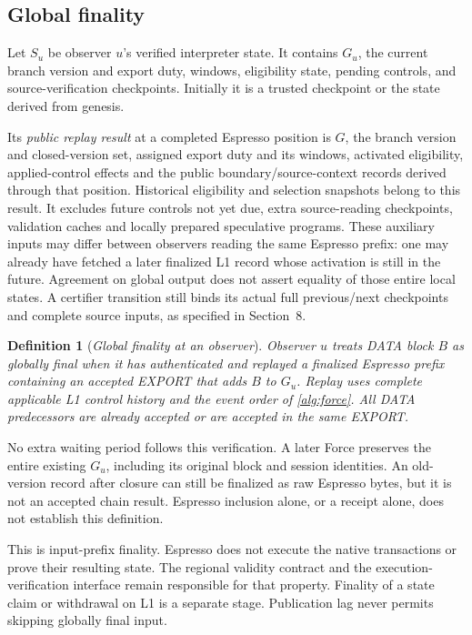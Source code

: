 \documentclass[11pt,a4paper]{article}
\newcommand{\defterm}[1]{\textcolor{rrBlue}{\textit{#1}}}
\newtheorem{definition}{Definition}[section]
\begin{document}
\subsection{Global finality}
\label{sec:global-finality}
Let $S_u$ be observer $u$'s verified interpreter state. It contains $G_u$,
the current branch version and export duty, windows, eligibility state, pending
controls, and source-verification checkpoints.
Initially it is a trusted checkpoint or the state derived from genesis.

Its \defterm{public replay result} at a completed Espresso position is
$G$, the branch version and closed-version set, assigned export duty and
its windows, activated eligibility, applied-control effects and the
public boundary/source-context records derived through that position.
Historical eligibility and selection snapshots belong to this result.
It excludes future controls not yet due, extra source-reading checkpoints,
validation caches and locally prepared speculative programs.
These auxiliary inputs may differ between observers reading the same
Espresso prefix: one may already have fetched a later finalized L1 record
whose activation is still in the future. Agreement on global output
does not assert equality of those entire local states.
A certifier transition still binds its actual full previous/next
checkpoints and complete source inputs, as specified in Section~8.

\begin{definition}[\defterm{Global finality at an observer}]
\label{def:global-finality}
Observer $u$ treats DATA block $B$ as globally final when it has
authenticated and replayed a finalized Espresso prefix containing an
accepted EXPORT that adds $B$ to $G_u$. Replay uses complete applicable
L1 control history and the event order of \cref{alg:force}. All DATA
predecessors are already accepted or are accepted in the same EXPORT.
\end{definition}

No extra waiting period follows this verification. A later Force
preserves the entire existing $G_u$, including its original block and
session identities. An old-version record after closure can still be
finalized as raw Espresso bytes, but it is not an accepted chain result.
Espresso inclusion alone, or a receipt alone, does not establish this
definition.

This is input-prefix finality. Espresso does not execute the native
transactions or prove their resulting state. The regional validity
contract and the execution-verification interface remain responsible
for that property. Finality of a state claim or withdrawal on L1 is a
separate stage. Publication lag never permits skipping globally final
input.
\end{document}
